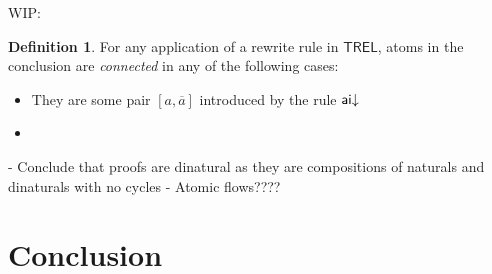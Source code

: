 \documentclass[11pt, oneside]{article}
\theoremstyle{plain}
\theoremstyle{definition}
\newtheorem{definition}[theorem]{Definition}
\newcommand{\sSys}{{\mathsf{TREL}}}%
\begin{document}
WIP:
\begin{definition}
For any application of a rewrite rule in $\sSys$, atoms in the conclusion are \textit{connected} in any of the following cases:
\begin{itemize}
    \item They are some pair $[a,\overline{a}]$ introduced by the rule ${\mathsf {ai}}{\downarrow}$
    \item 
\end{itemize}
\end{definition}

- Conclude that proofs are dinatural as they are compositions of naturals and dinaturals with no cycles
- Atomic flows????

\newpage
\section{Conclusion}

\newpage


\end{document}
